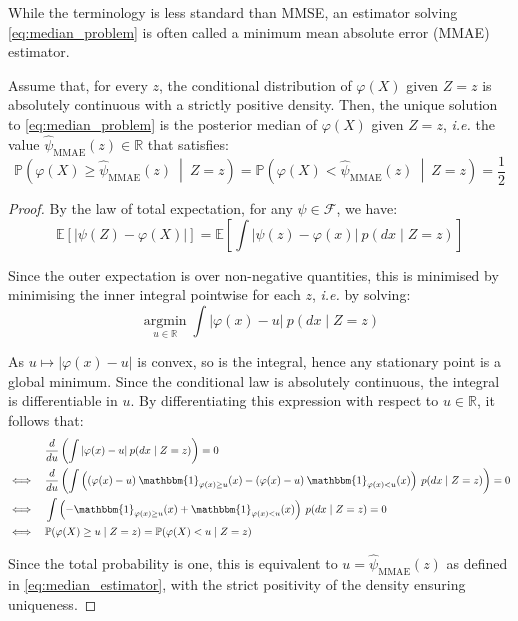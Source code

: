 While the terminology is less standard than MMSE, an estimator solving \eqref{eq:median_problem} is often called a minimum mean absolute error (MMAE) estimator.

\begin{proposition}
	Assume that, for every $z$, the conditional distribution of $\varphi(X)$ given $Z=z$ is absolutely continuous with a strictly positive density. Then, the unique solution to \eqref{eq:median_problem} is the posterior median of $\varphi(X)$ given $Z=z$, \textit{i.e.} the value $\hat{\psi}_{\mathrm{MMAE}}(z)\in\mathbb{R}$ that satisfies:
	\begin{equation}
		\mathbb{P}\left(\varphi(X)\geq\hat{\psi}_{\mathrm{MMAE}}(z)\:\middle|\:Z=z\right)=\mathbb{P}\left(\varphi(X)<\hat{\psi}_{\mathrm{MMAE}}(z)\:\middle|\:Z=z\right)=\frac{1}{2}\label{eq:median_estimator}
	\end{equation}
\end{proposition}

\begin{proof}
	By the law of total expectation, for any $\psi\in\mathcal{F}$, we have:
	\begin{equation}
		\mathbb{E}[|\psi(Z)-\varphi(X)|]=\mathbb{E}\left[\int{|\psi(z)-\varphi(x)|\:p(dx\mid Z=z)}\right]
	\end{equation}

	Since the outer expectation is over non-negative quantities, this is minimised by minimising the inner integral pointwise for each $z$, \textit{i.e.} by solving:
	\begin{equation}
		\underset{u\in\mathbb{R}}{\operatorname{argmin}}\int{|\varphi(x)-u|\:p(dx\mid Z=z)}
	\end{equation}

	As $u\mapsto|\varphi(x)-u|$ is convex, so is the integral, hence any stationary point is a global minimum. Since the conditional law is absolutely continuous, the integral is differentiable in $u$. By differentiating this expression with respect to $u\in\mathbb{R}$, it follows that:
	\begin{equation}
		\begin{aligned}
		&\frac{d}{du}\left(\int{|\varphi(x)-u|\:p(dx\mid Z=z)}\right)=0\\
		\iff\quad&\frac{d}{du}\left(\int{\left((\varphi(x)-u)\:\mathbbm{1}_{\varphi(x)\geq u}(x)-(\varphi(x)-u)\:\mathbbm{1}_{\varphi(x)<u}(x)\right)\:p(dx\mid Z=z)}\right)=0\\
		\iff\quad&\int{\left(-\mathbbm{1}_{\varphi(x)\geq u}(x)+\mathbbm{1}_{\varphi(x)<u}(x)\right)\:p(dx\mid Z=z)}=0\\
		\iff\quad&\mathbb{P}(\varphi(X)\geq u\mid Z=z)=\mathbb{P}(\varphi(X)<u\mid Z=z)
		\end{aligned}
	\end{equation}

	Since the total probability is one, this is equivalent to $u=\hat{\psi}_{\mathrm{MMAE}}(z)$ as defined in \eqref{eq:median_estimator}, with the strict positivity of the density ensuring uniqueness.
\end{proof}

